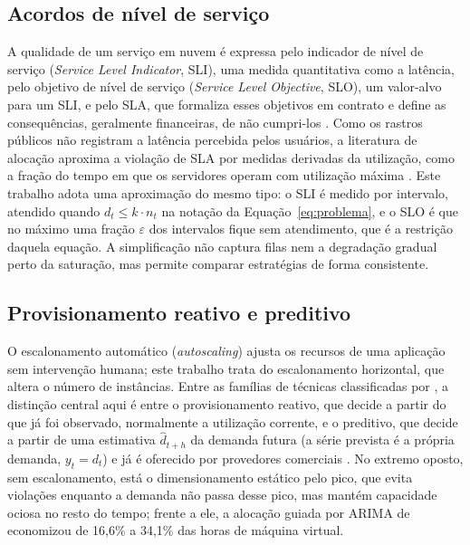 \subsection{Acordos de nível de serviço}
\label{subsec:sla}

A qualidade de um serviço em nuvem é expressa pelo indicador de nível de serviço (\textit{Service Level Indicator}, SLI), uma medida quantitativa como a latência, pelo objetivo de nível de serviço (\textit{Service Level Objective}, SLO), um valor-alvo para um SLI, e pelo SLA, que formaliza esses objetivos em contrato e define as consequências, geralmente financeiras, de não cumpri-los \cite{beyer2016sre}. Como os rastros públicos não registram a latência percebida pelos usuários, a literatura de alocação aproxima a violação de SLA por medidas derivadas da utilização, como a fração do tempo em que os servidores operam com utilização máxima \cite{beloglazov2012optimal}. Este trabalho adota uma aproximação do mesmo tipo: o SLI é medido por intervalo, atendido quando $d_t \leq k \cdot n_t$ na notação da Equação~\ref{eq:problema}, e o SLO é que no máximo uma fração $\varepsilon$ dos intervalos fique sem atendimento, que é a restrição daquela equação. A simplificação não captura filas nem a degradação gradual perto da saturação, mas permite comparar estratégias de forma consistente.

\subsection{Provisionamento reativo e preditivo}
\label{subsec:provisionamento}

O escalonamento automático (\textit{autoscaling}) ajusta os recursos de uma aplicação sem intervenção humana; este trabalho trata do escalonamento horizontal, que altera o número de instâncias. Entre as famílias de técnicas classificadas por , a distinção central aqui é entre o provisionamento reativo, que decide a partir do que já foi observado, normalmente a utilização corrente, e o preditivo, que decide a partir de uma estimativa $\hat{d}_{t+h}$ da demanda futura (a série prevista é a própria demanda, $y_t = d_t$) e já é oferecido por provedores comerciais \cite{aws2024predictive}. No extremo oposto, sem escalonamento, está o dimensionamento estático pelo pico, que evita violações enquanto a demanda não passa desse pico, mas mantém capacidade ociosa no resto do tempo; frente a ele, a alocação guiada por ARIMA de  economizou de 16,6\% a 34,1\% das horas de máquina virtual.

